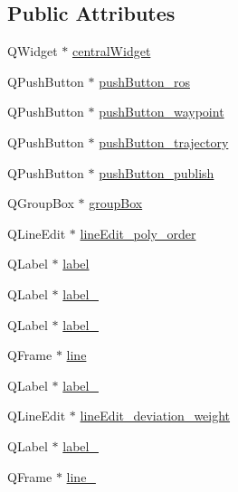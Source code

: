 \subsection*{Public Attributes}
\begin{DoxyCompactItemize}
\item 
Q\+Widget $\ast$ \hyperlink{class_ui___main_window_a6600dd3bdd3d55e535659e4a4096ea48}{central\+Widget}
\item 
Q\+Push\+Button $\ast$ \hyperlink{class_ui___main_window_aa92103c3833c2d9702d9fe03df3a48f4}{push\+Button\+\_\+ros}
\item 
Q\+Push\+Button $\ast$ \hyperlink{class_ui___main_window_ae474025a1640cbb55bec3205474f0a1f}{push\+Button\+\_\+waypoint}
\item 
Q\+Push\+Button $\ast$ \hyperlink{class_ui___main_window_ade777d3fea8e356a341eba1ce6dd242e}{push\+Button\+\_\+trajectory}
\item 
Q\+Push\+Button $\ast$ \hyperlink{class_ui___main_window_a5ecf2ba9a2778d906864493f45ee67a5}{push\+Button\+\_\+publish}
\item 
Q\+Group\+Box $\ast$ \hyperlink{class_ui___main_window_ad396eaa8d855b13559c50e02164b8325}{group\+Box}
\item 
Q\+Line\+Edit $\ast$ \hyperlink{class_ui___main_window_ad06eaa4cbcd0eddeda7136d30b0f9fef}{line\+Edit\+\_\+poly\+\_\+order}
\item 
Q\+Label $\ast$ \hyperlink{class_ui___main_window_a78edcdd12ea78c06d7e80f322c8882f9}{label}
\item 
Q\+Label $\ast$ \hyperlink{class_ui___main_window_a2f5576686ce98bcc41bd1b1eca07e56a}{label\+\_}
\item 
Q\+Label $\ast$ \hyperlink{class_ui___main_window_a253fbc5b44941384321b7c58cf96cc65}{label\+\_}
\item 
Q\+Frame $\ast$ \hyperlink{class_ui___main_window_a249d59b1188cc69f7e0290da15019085}{line}
\item 
Q\+Label $\ast$ \hyperlink{class_ui___main_window_a953dcd0e658a0903339e2ef3c94d4e7e}{label\+\_}
\item 
Q\+Line\+Edit $\ast$ \hyperlink{class_ui___main_window_a70ba66673066720ed431921d1c7f33fb}{line\+Edit\+\_\+deviation\+\_\+weight}
\item 
Q\+Label $\ast$ \hyperlink{class_ui___main_window_af121c391d64554ab2602ae6174e03d95}{label\+\_}
\item 
Q\+Frame $\ast$ \hyperlink{class_ui___main_window_a05cd891c7a6c198155d7559787d29485}{line\+\_}
\item 

\end{DoxyCompactItemize}
